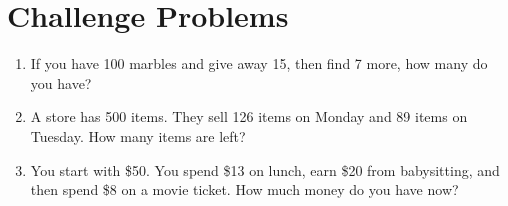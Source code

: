 \section{Challenge Problems}
\begin{enumerate}
    \item If you have 100 marbles and give away 15, then find 7 more, how many do you have?
    \item A store has 500 items. They sell 126 items on Monday and 89 items on Tuesday. How many items are left?
    \item You start with \$50. You spend \$13 on lunch, earn \$20 from babysitting, and then spend \$8 on a movie ticket. How much money do you have now?
\end{enumerate}

